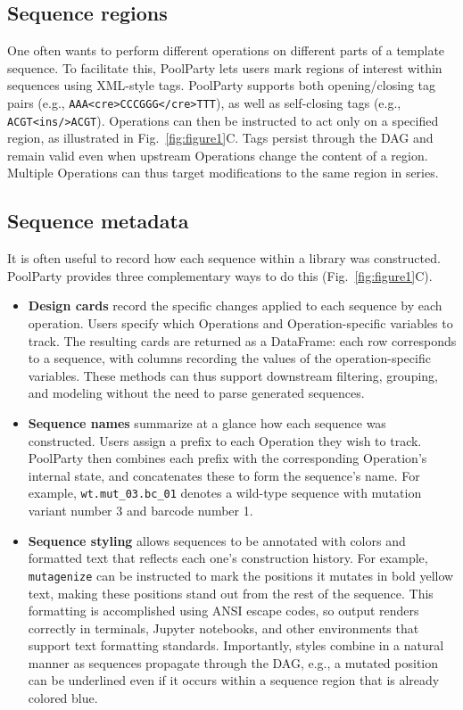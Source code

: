 \documentclass[unnumsec,webpdf,modern,large]{mam-authoring-template}%
\theoremstyle{thmstyleone}%
\theoremstyle{thmstyletwo}%
\theoremstyle{thmstylethree}%
\begin{document}
\subsection{Sequence regions}

One often wants to perform different operations on different parts of a template sequence. To facilitate this, PoolParty lets users mark regions of interest within sequences using XML-style tags. PoolParty supports both opening/closing tag pairs (e.g., \texttt{AAA<cre>CCCGGG</cre>TTT}), as well as self-closing tags (e.g., \texttt{ACGT<ins/>ACGT}). Operations can then be instructed to act only on a specified region, as illustrated in Fig.\ \ref{fig:figure1}C. Tags persist through the DAG and remain valid even when upstream Operations change the content of a region. Multiple Operations can thus target modifications to the same region in series.

\subsection{Sequence metadata}

It is often useful to record how each sequence within a library was constructed. PoolParty provides three complementary ways to do this (Fig.~\ref{fig:figure1}C).

\begin{itemize}
\item \textbf{Design cards} record the specific changes applied to each sequence by each operation. Users specify which Operations and Operation-specific variables to track. The resulting cards are returned as a DataFrame: each row corresponds to a sequence, with columns recording the values of the operation-specific variables. These methods can thus support downstream filtering, grouping, and modeling without the need to parse generated sequences.

\item \textbf{Sequence names} summarize at a glance how each sequence was constructed. Users assign a prefix to each Operation they wish to track. PoolParty then combines each prefix with the corresponding Operation's internal state, and concatenates these to form the sequence's name. For example, \texttt{wt.mut\_03.bc\_01} denotes a wild-type sequence with mutation variant number 3 and barcode number 1.

\item \textbf{Sequence styling} allows sequences to be annotated with colors and formatted text that reflects each one's construction history. For example, \texttt{mutagenize} can be instructed to mark the positions it mutates in bold yellow text, making these positions stand out from the rest of the sequence. This formatting is accomplished using ANSI escape codes, so output renders correctly in terminals, Jupyter notebooks, and other environments that support text formatting standards. Importantly, styles combine in a natural manner as sequences propagate through the DAG, e.g., a mutated position can be underlined even if it occurs within a sequence region that is already colored blue.
\end{itemize}
\end{document}

